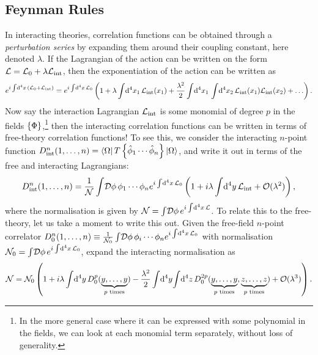 \documentclass[../main.tex]{subfiles}
\begin{document}
\subsection{Feynman Rules}
In interacting theories, correlation functions can be obtained through a \emph{perturbation series} by expanding them around their coupling constant, here denoted \(\lambda\).
If the Lagrangian of the action can be written on the form \(\mathcal{L} = \mathcal{L}_0 + \lambda\mathcal{L}_\text{int}\), then the exponentiation of the action can be written as
\begin{align}
  e^{i \int \!\mathrm{d}^4x\, \left(\mathcal{L}_0 + \mathcal{L}_\text{int}\right)} = e^{i \int \!\mathrm{d}^4x\, \mathcal{L}_0} \left(1 + \lambda\int \!\mathrm{d}^4x_1\, \mathcal{L}_\text{int}(x_1) + \frac{\lambda^2}{2} \int \!\mathrm{d}^4x_1\,\int \!\mathrm{d}^4x_2\, \mathcal{L}_\text{int}(x_1) \mathcal{L}_\text{int}(x_2) + \ldots\right).
\end{align}
Now say the interaction Lagrangian \(\mathcal{L}_\text{int}\) is some monomial of degree \(p\) in the fields \(\left\{\Phi\right\}\),\footnote{In the more general case where it can be expressed with some polynomial in the fields, we can look at each monomial term separately, without loss of generality.} then the interacting correlation functions can be written in terms of free-theory correlation functions!
To see this, we consider the interacting \(n\)-point function \(D^n_\text{int}(1,\ldots, n) = \left\langle \Omega \right| T\left\{\hat\phi_1 \cdots \hat\phi_n\right\} \left| \Omega \right\rangle\), and write it out in terms of the free and interacting Lagrangians:
\begin{align}
  \label{qft:eq:n-point_interactive_correlator}
  D^n_\text{int}(1,\ldots, n) = \frac{1}{\mathcal{N}} \int\!\mathcal{D}\phi\, \phi_1\cdots \phi_n e^{i\int \!\mathrm{d}^4x\,\mathcal{L}_0}\left(1 + i\lambda \int \!\mathrm{d}^4y\,\mathcal{L}_\text{int} + \mathcal{O}(\lambda^2)\right),
\end{align}
where the normalisation is given by \(\mathcal{N} = \int\!\mathcal{D}\phi\, e^{i\int \!\mathrm{d}^4x\,\mathcal{L}}\).
To relate this to the free-theory, let us take a moment to write this out.
Given the free-field \(n\)-point correlator \(D^n_0(1,\ldots,n) \equiv \frac{1}{\mathcal{N}_0} \int\!\mathcal{D}\phi\, \phi_i \cdots \phi_n e^{i\int \!\mathrm{d}^4x\,\mathcal{L}_0}\) with normalisation \(\mathcal{N}_0 = \int\!\mathcal{D}\phi\, e^{i\int \!\mathrm{d}^4x\,\mathcal{L}_0}\), expand the interacting normalisation as
\begin{equation}
  \mathcal{N} = \mathcal{N}_0 \left(1 + i\lambda \int \!\mathrm{d}^4y\, D_0^p(\underbrace{y, \ldots, y}_{p\text{ times}}) - \frac{\lambda^2}{2} \int \!\mathrm{d}^4y\,\!\! \int \!\mathrm{d}^4z\, D_0^{2p}(\underbrace{y,\ldots,y}_{p\text{ times}}, \underbrace{z,\ldots,z}_{p\text{ times}}) + \mathcal{O}(\lambda^3)\right).
\end{equation}
\end{document}
